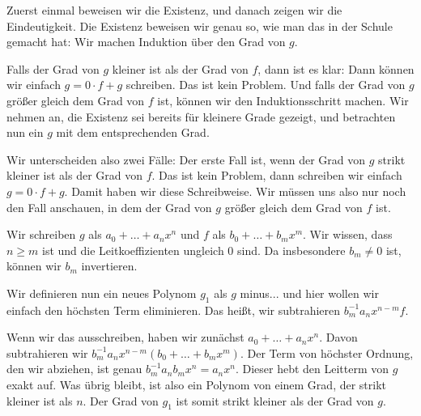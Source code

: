 \begin{spoken-clean}[00:22:50 - 00:24:30]
Zuerst einmal beweisen wir die Existenz, und danach zeigen wir die Eindeutigkeit. Die Existenz beweisen wir genau so, wie man das in der Schule gemacht hat: Wir machen Induktion über den Grad von $g$.

Falls der Grad von $g$ kleiner ist als der Grad von $f$, dann ist es klar: Dann können wir einfach $g = 0 \cdot f + g$ schreiben. Das ist kein Problem. Und falls der Grad von $g$ größer gleich dem Grad von $f$ ist, können wir den Induktionsschritt machen. Wir nehmen an, die Existenz sei bereits für kleinere Grade gezeigt, und betrachten nun ein $g$ mit dem entsprechenden Grad.

Wir unterscheiden also zwei Fälle: Der erste Fall ist, wenn der Grad von $g$ strikt kleiner ist als der Grad von $f$. Das ist kein Problem, dann schreiben wir einfach $g = 0 \cdot f + g$. Damit haben wir diese Schreibweise. Wir müssen uns also nur noch den Fall anschauen, in dem der Grad von $g$ größer gleich dem Grad von $f$ ist.
\end{spoken-clean}

\begin{spoken-clean}[00:24:30 - 00:28:00]
Wir schreiben $g$ als $a_0 + \dots + a_n x^n$ und $f$ als $b_0 + \dots + b_m x^m$. Wir wissen, dass $n \ge m$ ist und die Leitkoeffizienten ungleich $0$ sind. Da insbesondere $b_m \neq 0$ ist, können wir $b_m$ invertieren.

Wir definieren nun ein neues Polynom $g_1$ als $g$ minus... und hier wollen wir einfach den höchsten Term eliminieren. Das heißt, wir subtrahieren $b_m^{-1} a_n x^{n-m} f$.

Wenn wir das ausschreiben, haben wir zunächst $a_0 + \dots + a_n x^n$. Davon subtrahieren wir $b_m^{-1} a_n x^{n-m} (b_0 + \dots + b_m x^m)$. Der Term von höchster Ordnung, den wir abziehen, ist genau $b_m^{-1} a_n b_m x^n = a_n x^n$. Dieser hebt den Leitterm von $g$ exakt auf. Was übrig bleibt, ist also ein Polynom von einem Grad, der strikt kleiner ist als $n$. Der Grad von $g_1$ ist somit strikt kleiner als der Grad von $g$.
\end{spoken-clean}

